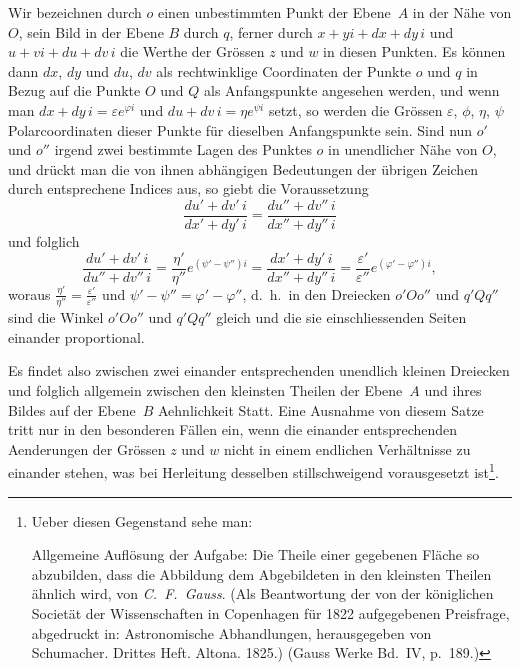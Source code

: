 \documentclass[a4paper,12pt]{article}
\begin{document}
Wir bezeichnen durch $o$ einen unbestimmten Punkt der Ebene~$A$
in der N\"{a}he von $O$, sein Bild in der Ebene $B$ durch $q$,
ferner durch
$x + yi + dx + dy \, i$ und
$u + vi + du + dv \, i$ die Werthe der Gr\"{o}ssen $z$ und $w$ in
diesen Punkten.  Es k\"{o}nnen dann $dx$, $dy$ und $du$, $dv$ als
rechtwinklige Coordinaten der Punkte $o$ und $q$ in Bezug auf die
Punkte $O$ und $Q$ als Anfangspunkte angesehen werden, und wenn
man
$dx + dy \, i = \varepsilon e^{\varphi i}$
und
$du + dv \, i = \eta e^{\psi i}$
setzt, so werden die Gr\"{o}ssen
$\varepsilon$, $\phi$, $\eta$, $\psi$ Polarcoordinaten dieser
Punkte f\"{u}r dieselben Anfangspunkte sein.  Sind nun $o'$ und
$o''$ irgend zwei bestimmte Lagen des Punktes $o$ in unendlicher
N\"{a}he von $O$, und dr\"{u}ckt man die von ihnen abh\"{a}ngigen
Bedeutungen der \"{u}brigen Zeichen durch entsprechene Indices
aus, so giebt die Voraussetzung
\[    \frac{du'  + dv'  \, i}{dx'  + dy'  \, i}
    = \frac{du'' + dv'' \, i}{dx'' + dy'' \, i} \]
und folglich
\[    \frac{du'  + dv'  \, i}{du'' + dv'' \, i}
    = \frac{\eta'}{\eta''} e^{(\psi' - \psi'') i}
    = \frac{dx'  + dy'  \, i}{dx'' + dy'' \, i}
    = \frac{\varepsilon'}{\varepsilon''} e^{(\varphi' - \varphi'') i},\]
woraus
$\displaystyle
      \frac{\eta'}{\eta''}
    = \frac{\varepsilon'}{\varepsilon''}$
und
$\psi' - \psi'' = \varphi' - \varphi''$,
d.~h.\ in den Dreiecken $o' O o''$ und $q' Q q''$ sind die Winkel
$o' O o''$ und $q' Q q''$ gleich und die sie einschliessenden
Seiten einander proportional.

Es findet also zwischen zwei einander entsprechenden unendlich
kleinen Dreiecken und folglich allgemein zwischen den kleinsten
Theilen der Ebene~$A$ und ihres Bildes auf der Ebene~$B$
Aehnlichkeit Statt.  Eine Ausnahme von diesem Satze tritt nur in
den besonderen F\"{a}llen ein, wenn die einander entsprechenden
Aenderungen der Gr\"{o}ssen $z$ und $w$ nicht in einem endlichen
Verh\"{a}ltnisse zu einander stehen, was bei Herleitung desselben
stillschweigend vorausgesetzt ist\footnote{Ueber diesen
Gegenstand sehe man:

\glqq Allgemeine Aufl\"{o}sung der Aufgabe: Die Theile einer
gegebenen Fl\"{a}che so abzubilden, dass die Abbildung dem
Abgebildeten in den kleinsten Theilen \"{a}hnlich wird\grqq,
von \emph{C.~F.~Gauss}.  (Als Beantwortung der von der
k\"{o}niglichen Societ\"{a}t der Wissenschaften in Copenhagen
f\"{u}r 1822 aufgegebenen Preisfrage, abgedruckt in: \glqq
Astronomische Abhandlungen, herausgegeben von Schumacher.
Drittes Heft. Altona. 1825.\grqq)  (Gauss Werke Bd.~IV, p.~189.)}.
\end{document}
